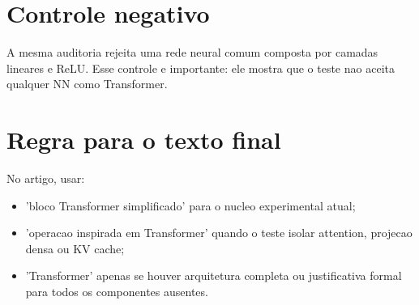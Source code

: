\section{Controle negativo}





A mesma auditoria rejeita uma rede neural comum composta por camadas lineares e ReLU. Esse controle e importante: ele mostra que o teste nao aceita qualquer NN como Transformer.



\section{Regra para o texto final}



No artigo, usar:


\begin{itemize}
\item 'bloco Transformer simplificado' para o nucleo experimental atual;
\item 'operacao inspirada em Transformer' quando o teste isolar attention,
projecao densa ou KV cache;
\item 'Transformer' apenas se houver arquitetura completa ou justificativa formal
para todos os componentes ausentes.
\end{itemize}
